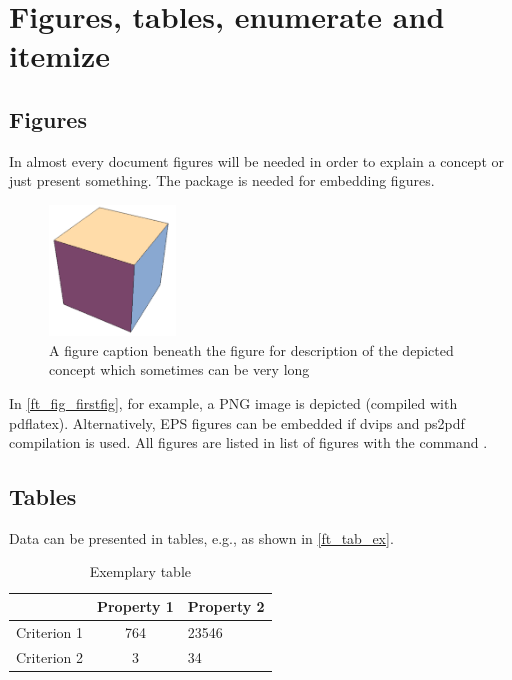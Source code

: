 \chapter{Figures, tables, enumerate and itemize}


\section{Figures}

In almost every document figures will be needed in order to explain a concept or just present something. The package  is needed for embedding figures.

\begin{figure}[!h]
	\centering
	\includegraphics[width=0.3\textwidth]{figures/cube}
	\caption{A figure caption beneath the figure for description of the depicted concept which sometimes can be very long}
	\label{ft_fig_firstfig}
\end{figure}

In \autoref{ft_fig_firstfig}, for example, a PNG image is depicted (compiled with pdflatex). Alternatively, EPS figures can be embedded if dvips and ps2pdf compilation is used. All figures are listed in list of figures with the command .


\section{Tables}

Data can be presented in tables, e.g., as shown in \autoref{ft_tab_ex}.

\begin{table}[!h]
	\centering
	\begin{tabular}{l|cl}
	\hline \hline
	
		& Property 1
		& Property 2\\ \hline
	Criterion 1
		& 764
		& 23546 \\
	Criterion 2
		& 3
		& 34 \\
	\hline \hline
	\end{tabular}
	\caption{Exemplary table}
	\label{ft_tab_ex}
\end{table}

